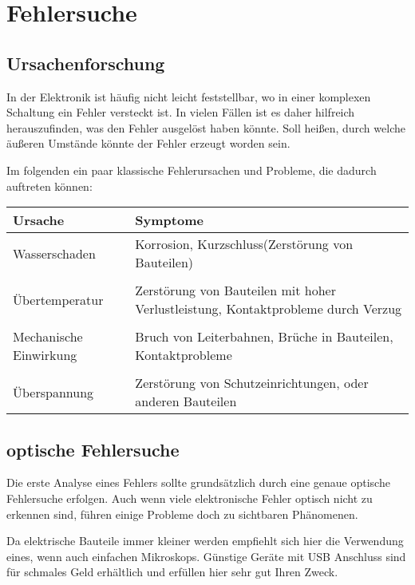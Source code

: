 \section{Fehlersuche}

\subsection{Ursachenforschung}

In der Elektronik ist häufig nicht leicht feststellbar, wo in einer komplexen Schaltung ein Fehler versteckt ist.
In vielen Fällen ist es daher hilfreich herauszufinden, was den Fehler ausgelöst haben könnte.
Soll heißen, durch welche äußeren Umstände könnte der Fehler erzeugt worden sein.

Im folgenden ein paar klassische Fehlerursachen und Probleme, die dadurch auftreten können:\\

\begin{tabular}{p{80pt}p{300pt}}

	Ursache & Symptome \\ 
	\hline 
	Wasserschaden & Korrosion, Kurzschluss(Zerstörung von Bauteilen) \\ \\
	Übertemperatur	& Zerstörung von Bauteilen mit hoher Verlustleistung, Kontaktprobleme durch Verzug \\ \\
	Mechanische Einwirkung & Bruch von Leiterbahnen, Brüche in Bauteilen, Kontaktprobleme\\ \\
	Überspannung & Zerstörung von Schutzeinrichtungen, oder anderen Bauteilen\\

\end{tabular} 

\subsection{optische Fehlersuche}

Die erste Analyse eines Fehlers sollte grundsätzlich durch eine genaue optische Fehlersuche erfolgen.
Auch wenn viele elektronische Fehler optisch nicht zu erkennen sind, führen einige Probleme doch zu sichtbaren Phänomenen.

Da elektrische Bauteile immer kleiner werden empfiehlt sich hier die Verwendung eines, wenn auch einfachen Mikroskops. Günstige Geräte mit USB Anschluss sind für schmales Geld erhältlich und erfüllen hier sehr gut Ihren Zweck.

